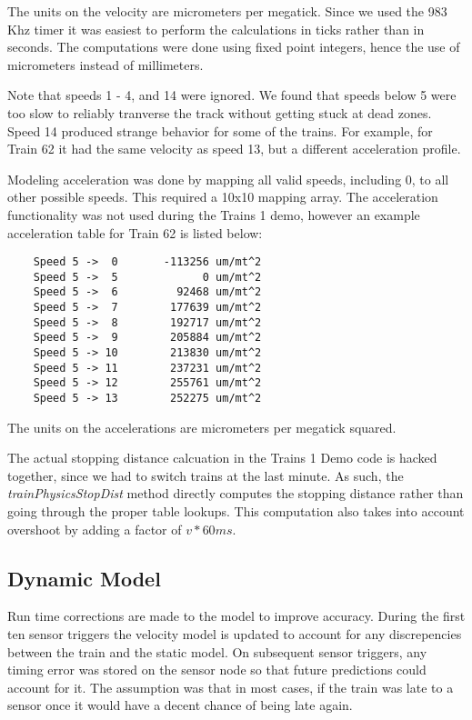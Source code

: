 \documentclass[twoside,a4paper]{refart}
\begin{document}
The units on the velocity are micrometers per megatick. Since we used the 983 Khz timer it was easiest to perform the calculations in ticks rather than in seconds. The computations were done using fixed point integers, hence the use of micrometers instead of millimeters.

Note that speeds 1 - 4, and 14 were ignored. We found that speeds below 5 were too slow to reliably tranverse the track without getting stuck at dead zones. Speed 14 produced strange behavior for some of the trains. For example, for Train 62 it had the same velocity as speed 13, but a different acceleration profile.

Modeling acceleration was done by mapping all valid speeds, including 0, to all other possible speeds. This required a 10x10 mapping array. The acceleration functionality was not used during the Trains 1 demo, however an example acceleration table for Train 62 is listed below:

\begin{verbatim}
    Speed 5 ->  0       -113256 um/mt^2
    Speed 5 ->  5             0 um/mt^2
    Speed 5 ->  6         92468 um/mt^2
    Speed 5 ->  7        177639 um/mt^2
    Speed 5 ->  8        192717 um/mt^2
    Speed 5 ->  9        205884 um/mt^2
    Speed 5 -> 10        213830 um/mt^2
    Speed 5 -> 11        237231 um/mt^2
    Speed 5 -> 12        255761 um/mt^2
    Speed 5 -> 13        252275 um/mt^2
\end{verbatim}

The units on the accelerations are micrometers per megatick squared.

The actual stopping distance calcuation in the Trains 1 Demo code is hacked together, since we had to switch trains at the last minute. As such, the \textit{trainPhysicsStopDist} method directly computes the stopping distance rather than going through the proper table lookups. This computation also takes into account overshoot by adding a factor of $v*60ms$.

\subsection{Dynamic Model}

Run time corrections are made to the model to improve accuracy. During the first ten sensor triggers the velocity model is updated to account for any discrepencies between the train and the static model. On subsequent sensor triggers, any timing error was stored on the sensor node so that future predictions could account for it. The assumption was that in most cases, if the train was late to a sensor once it would have a decent chance of being late again.
\end{document}
